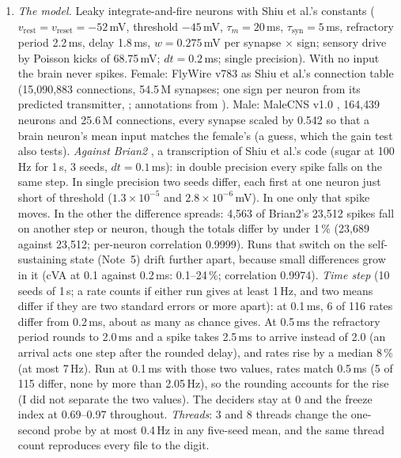 \documentclass[11pt,a4paper]{article}
\begin{document}
\begin{enumerate}[leftmargin=*, label=\arabic*., itemsep=4pt]

\item \emph{The model.} Leaky integrate-and-fire neurons with Shiu et al.'s constants ($v_\text{rest}=v_\text{reset}=-52$\,mV, threshold $-45$\,mV, $\tau_m=20$\,ms, $\tau_\text{syn}=5$\,ms, refractory period 2.2\,ms, delay 1.8\,ms, $w=0.275$\,mV per synapse $\times$ sign; sensory drive by Poisson kicks of 68.75\,mV; $dt=0.2$\,ms; single precision). With no input the brain never spikes. Female: FlyWire v783 as Shiu et al.'s connection table (15{,}090{,}883 connections, 54.5\,M synapses; one sign per neuron from its predicted transmitter, \citealt{eckstein2024neurotransmitter}; annotations from \citealt{schlegel2024whole}). Male: MaleCNS v1.0 \citep{berg2026sexual}, 164{,}439 neurons and 25.6\,M connections, every synapse scaled by 0.542 so that a brain neuron's mean input matches the female's (a guess, which the gain test also tests). \emph{Against Brian2} \citep{stimberg2019brian}, a transcription of Shiu et al.'s code (sugar at 100\,Hz for 1\,s, 3 seeds, $dt=0.1$\,ms): in double precision every spike falls on the same step. In single precision two seeds differ, each first at one neuron just short of threshold ($1.3\times10^{-5}$ and $2.8\times10^{-6}$\,mV). In one only that spike moves. In the other the difference spreads: 4{,}563 of Brian2's 23{,}512 spikes fall on another step or neuron, though the totals differ by under 1\,\% (23{,}689 against 23{,}512; per-neuron correlation 0.9999). Runs that switch on the self-sustaining state (Note~5) drift further apart, because small differences grow in it (cVA at 0.1 against 0.2\,ms: 0.1--24\,\%; correlation 0.9974). \emph{Time step} (10 seeds of 1\,s; a rate counts if either run gives at least 1\,Hz, and two means differ if they are two standard errors or more apart): at 0.1\,ms, 6 of 116 rates differ from 0.2\,ms, about as many as chance gives. At 0.5\,ms the refractory period rounds to 2.0\,ms and a spike takes 2.5\,ms to arrive instead of 2.0 (an arrival acts one step after the rounded delay), and rates rise by a median 8\,\% (at most 7\,Hz). Run at 0.1\,ms with those two values, rates match 0.5\,ms (5 of 115 differ, none by more than 2.05\,Hz), so the rounding accounts for the rise (I did not separate the two values). The deciders stay at 0 and the freeze index at 0.69--0.97 throughout. \emph{Threads}: 3 and 8 threads change the one-second probe by at most 0.4\,Hz in any five-seed mean, and the same thread count reproduces every file to the digit.


\end{enumerate}
\end{document}
